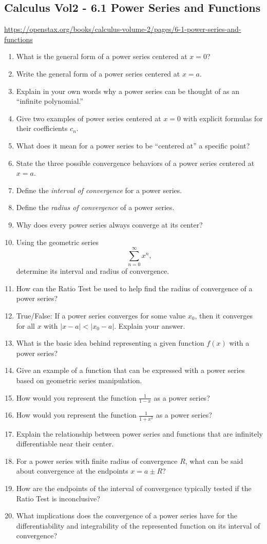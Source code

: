 \subsection{Calculus Vol2 - 6.1 Power Series and Functions}

\url{https://openstax.org/books/calculus-volume-2/pages/6-1-power-series-and-functions}

\begin{enumerate}
  \item What is the general form of a power series centered at \(x=0\)?
  \item Write the general form of a power series centered at \(x=a\).
  \item Explain in your own words why a power series can be thought of as an “infinite polynomial.”
  \item Give two examples of power series centered at \(x=0\) with explicit formulas for their coefficients \(c_n\).
  \item What does it mean for a power series to be “centered at” a specific point?
  \item State the three possible convergence behaviors of a power series centered at \(x=a\).
  \item Define the \emph{interval of convergence} for a power series.
  \item Define the \emph{radius of convergence} of a power series.
  \item Why does every power series always converge at its center?
  \item Using the geometric series
    \[
      \sum_{n=0}^\infty x^n,
    \]
    determine its interval and radius of convergence.
  \item How can the Ratio Test be used to help find the radius of convergence of a power series?
  \item True/False: If a power series converges for some value \(x_0\), then it converges for all \(x\) with \(|x-a|<|x_0-a|\). Explain your answer.
  \item What is the basic idea behind representing a given function \(f(x)\) with a power series?
  \item Give an example of a function that can be expressed with a power series based on geometric series manipulation.
  \item How would you represent the function \(\frac{1}{1-x}\) as a power series?
  \item How would you represent the function \(\frac{1}{1+x^2}\) as a power series?
  \item Explain the relationship between power series and functions that are infinitely differentiable near their center.
  \item For a power series with finite radius of convergence \(R\), what can be said about convergence at the endpoints \(x=a\pm R\)?
  \item How are the endpoints of the interval of convergence typically tested if the Ratio Test is inconclusive?
  \item What implications does the convergence of a power series have for the differentiability and integrability of the represented function on its interval of convergence?
\end{enumerate}
